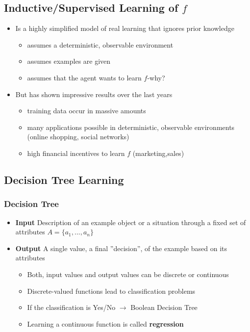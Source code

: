 \documentclass[conference]{styles/acmsiggraph}
\begin{document}
    \subsection{Inductive/Supervised Learning of $f$}
        \begin{itemize}
            \item Is a highly simplified model of real learning that ignores prior knowledge
            \begin{itemize}
                \item assumes a deterministic, observable environment
                \item assumes examples are given
                \item assumes that the agent wants to learn $f$-why?
            \end{itemize}
            \item But has shown impressive results over the last years
            \begin{itemize}
                \item training data occur in massive amounts
                \item many applications possible in deterministic, observable environments (online shopping, social networks)
                \item high financial incentives to learn $f$ (marketing,sales)
            \end{itemize}
        \end{itemize}

\newpage

    \subsection{Decision Tree Learning}
        \subsubsection{Decision Tree}
            \begin{itemize}
                \item \textbf{Input}\newline
                Description of an example object or a situation through a fixed set of attributes $A = \{a_1,...,a_n\}$
                \item \textbf{Output}\newline
                A single value, a final ''decision'', of the example based on its attributes
                \begin{itemize}
                    \item Both, input values and output values can be discrete or continuous
                    \item Discrete-valued functions lead to classification problems
                    \item If the classification is Yes/No $\rightarrow$ Boolean Decision Tree
                    \item Learning a continuous function is called \textbf{regression}
                \end{itemize}
            \end{itemize}
    
\end{document}
